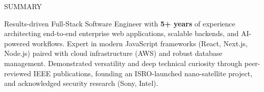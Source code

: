 \documentclass{resume} %
\begin{document}

\begin{rSection}{SUMMARY}

Results-driven Full-Stack Software Engineer with \textbf{5+ years} of experience architecting end-to-end enterprise web applications, scalable backends, and AI-powered workflows. Expert in modern JavaScript frameworks (React, Next.js, Node.js) paired with cloud infrastructure (AWS) and robust database management. Demonstrated versatility and deep technical curiosity through peer-reviewed IEEE publications, founding an ISRO-launched nano-satellite project, and acknowledged security research (Sony, Intel).

\end{rSection} 
\end{document}
